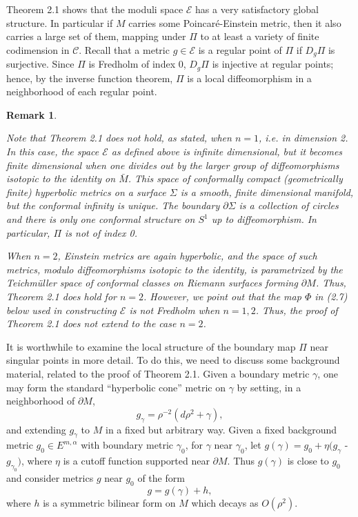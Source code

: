\documentclass[11pt,amsfonts]{amsart}
\newtheorem{remark}[theorem]{Remark}
\begin{document}
\medskip

   Theorem 2.1 shows that the moduli space ${\mathcal E}$ has a very 
satisfactory global structure. In particular if $M$ carries some 
Poincar\'e-Einstein metric, then it also carries a large set of them, 
mapping under $\Pi$ to at least a variety of finite codimension in ${\mathcal C}$. 
Recall that a metric $g \in {\mathcal E}$ is a regular point of $\Pi$ if 
$D_{g}\Pi$ is surjective. Since $\Pi$ is Fredholm of index $0$, $D_{g}\Pi$ 
is injective at regular points; hence, by the inverse function theorem, 
$\Pi$ is a local diffeomorphism in a neighborhood of each regular point. 

\begin{remark} \label{r 2.2.}
 {\rm  Note that Theorem 2.1 does not hold, as stated, when $n = 1$, 
i.e. in dimension 2. In this case, the space ${\mathcal E}$ 
as defined above is infinite dimensional, but it becomes finite 
dimensional when one divides out by the larger group of diffeomorphisms 
isotopic to the identity on $\bar M$. This space of conformally compact 
(geometrically finite) hyperbolic metrics on a surface $\Sigma$ is a smooth, 
finite dimensional manifold, but the conformal infinity is unique. 
The boundary $\partial \Sigma$ is a collection of circles and there is 
only one conformal structure on $S^{1}$ up to diffeomorphism. 
In particular, $\Pi$ is not of index 0. 

  When $n = 2$, Einstein metrics are again hyperbolic, and the space of 
such metrics, modulo diffeomorphisms isotopic to the identity, is 
parametrized by the Teichm\"uller space of conformal classes on Riemann 
surfaces forming $\partial M$. Thus, Theorem 2.1 does hold for $n = 2$. 
However, we point out that the map $\Phi$ in (2.7) below used in constructing 
${\mathcal E}$ is not Fredholm when $n = 1, 2$. Thus, the proof of Theorem 2.1 
does not extend to the case $n = 2$. }
\end{remark}

\medskip

 It is worthwhile to examine the local structure of the boundary map 
$\Pi$ near singular points in more detail. To do this, we need to 
discuss some background material, related to the proof of Theorem 2.1. 
Given a boundary metric $\gamma$, one may form the standard 
``hyperbolic cone'' metric on $\gamma$ by setting, in a neighborhood of 
$\partial M$,
$$g_{\gamma} = \rho^{-2}(d\rho^{2} +\gamma ), $$
and extending $g_{\gamma}$ to $M$ in a fixed but arbitrary way. Given a 
fixed background metric $g_{0}\in E^{m,\alpha}$ with boundary metric 
$\gamma_{0}$, for $\gamma $ near $\gamma_{0}$, let $g(\gamma) = g_{0} 
+ \eta (g_{\gamma}$ - $g_{\gamma_{0}})$, where $\eta$ is a cutoff 
function supported near $\partial M$. Thus $g(\gamma )$ is close to 
$g_{0}$ and consider metrics $g$ near $g_{0}$ of the form 
\begin{equation} \label{e2.5}
g = g(\gamma ) + h, 
\end{equation}
where $h$ is a symmetric bilinear form on $M$ which decays as 
$O(\rho^{2})$. 
\end{document}
